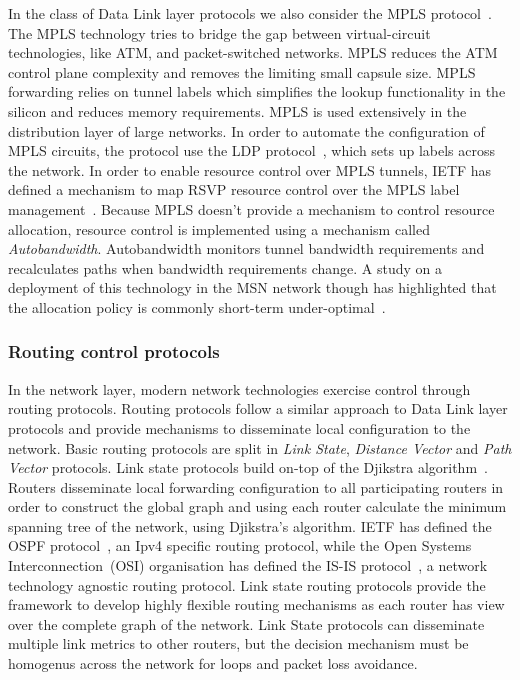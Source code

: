 In the class of Data Link layer protocols we also consider the MPLS
protocol~\cite{RFC3031}. The MPLS technology tries to bridge the gap between
virtual-circuit technologies, like ATM, and packet-switched networks. MPLS
reduces the ATM control plane complexity and removes the limiting small capsule
size. MPLS forwarding relies on tunnel labels which simplifies the lookup
functionality in the silicon and reduces memory requirements. MPLS is used
extensively in the distribution layer of large networks. In order to automate
the configuration of MPLS circuits, the protocol use the LDP
protocol~\cite{RFC5036}, which sets up labels across the network. In order to
enable resource control over MPLS tunnels, IETF has defined a mechanism to map
RSVP resource control over the MPLS label management~\cite{RFC3209}.  Because
MPLS doesn't provide a mechanism to control resource allocation, resource
control is implemented using a mechanism called {\it Autobandwidth}.
Autobandwidth monitors tunnel bandwidth requirements and recalculates paths when
bandwidth requirements change. A study on a deployment of this technology in the
MSN network though has highlighted that the allocation policy is commonly
short-term under-optimal~\cite{Pathak2011}.


\subsubsection{Routing control protocols}

In the network layer, modern network technologies exercise control through
routing protocols. Routing protocols follow a similar approach to Data Link
layer protocols and provide mechanisms to disseminate local configuration to the
network. Basic routing protocols are split in {\it Link State}, {\it Distance
  Vector} and {\it Path Vector} protocols. Link state protocols build on-top of
the Djikstra algorithm~\cite{Djikstra1959}. Routers disseminate local
forwarding configuration to all participating routers in order to construct the
global graph and using each router calculate the minimum
spanning tree of the network, using Djikstra's algorithm.  IETF has defined the
OSPF protocol~\cite{2328}, an Ipv4 specific routing protocol, while the
Open Systems Interconnection~(OSI)
organisation has defined the IS-IS protocol~\cite{RFC1142}, a network technology
agnostic routing protocol.
Link state routing protocols provide the framework to develop highly flexible
routing mechanisms as each router has view over the complete graph of the
network. Link State protocols can disseminate multiple
link metrics to other routers, but the decision mechanism must be
homogenus across the network for loops and packet loss avoidance.

